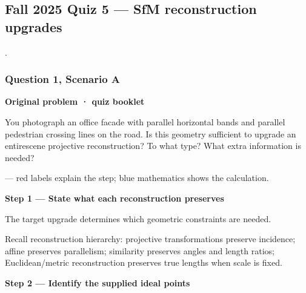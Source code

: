 \documentclass[letterpaper,11pt,english,openany,oneside]{jupyterBook}
\begin{document}
\subsection{Fall 2025 Quiz 5 — SfM reconstruction upgrades}
\label{\detokenize{lectures/lecture06/quiz-workbook:fall-2025-quiz-5-sfm-reconstruction-upgrades}}\label{\detokenize{lectures/lecture06/quiz-workbook:quiz-source-12}}
\sphinxAtStartPar
{} .


\subsubsection{Question 1, Scenario A}
\label{\detokenize{lectures/lecture06/quiz-workbook:question-1-scenario-a}}\label{\detokenize{lectures/lecture06/quiz-workbook:quiz-12-q1}}
\par\medskip\textbf{Original problem · quiz booklet}\par\smallskip

\sphinxAtStartPar
You photograph an office facade with parallel horizontal bands and parallel pedestrian crossing lines on the road. Is this geometry sufficient to upgrade an entire\sphinxhyphen{}scene projective reconstruction? To what type? What extra information is needed?

\par\medskip

\sphinxAtStartPar
{} — red labels explain the step; blue mathematics shows the calculation.

\par\medskip{}
{\color{QuizStepRed}\bfseries Step 1 — State what each reconstruction preserves}\par\smallskip

\sphinxAtStartPar
{} The target upgrade determines which geometric constraints are needed.

\sphinxAtStartPar
Recall reconstruction hierarchy: projective transformations preserve incidence; affine preserves parallelism; similarity preserves angles and length ratios; Euclidean/metric reconstruction preserves true lengths when scale is fixed.

\par

\par\medskip{}
{\color{QuizStepRed}\bfseries Step 2 — Identify the supplied ideal points}\par\smallskip
\end{document}
